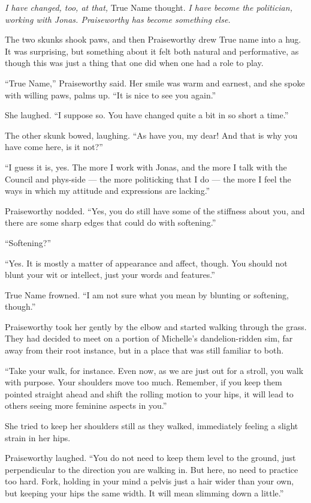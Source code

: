 \emph{I have changed, too, at that,} True Name thought. \emph{I have become the politician, working with Jonas. Praiseworthy has become something else.}

The two skunks shook paws, and then Praiseworthy drew True name into a hug. It was surprising, but something about it felt both natural and performative, as though this was just a thing that one did when one had a role to play.

``True Name,'' Praiseworthy said. Her smile was warm and earnest, and she spoke with willing paws, palms up. ``It is nice to see you again.''

She laughed. ``I suppose so. You have changed quite a bit in so short a time.''

The other skunk bowed, laughing. ``As have you, my dear! And that is why you have come here, is it not?''

``I guess it is, yes. The more I work with Jonas, and the more I talk with the Council and phys-side — the more politicking that I do — the more I feel the ways in which my attitude and expressions are lacking.''

Praiseworthy nodded. ``Yes, you do still have some of the stiffness about you, and there are some sharp edges that could do with softening.''

``Softening?''

``Yes. It is mostly a matter of appearance and affect, though. You should not blunt your wit or intellect, just your words and features.''

True Name frowned. ``I am not sure what you mean by blunting or softening, though.''

Praiseworthy took her gently by the elbow and started walking through the grass. They had decided to meet on a portion of Michelle's dandelion-ridden sim, far away from their root instance, but in a place that was still familiar to both.

``Take your walk, for instance. Even now, as we are just out for a stroll, you walk with purpose. Your shoulders move too much. Remember, if you keep them pointed straight ahead and shift the rolling motion to your hips, it will lead to others seeing more feminine aspects in you.''

She tried to keep her shoulders still as they walked, immediately feeling a slight strain in her hips.

Praiseworthy laughed. ``You do not need to keep them level to the ground, just perpendicular to the direction you are walking in. But here, no need to practice too hard. Fork, holding in your mind a pelvis just a hair wider than your own, but keeping your hips the same width. It will mean slimming down a little.''

